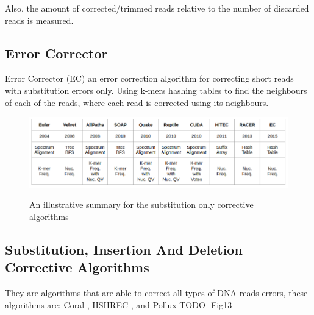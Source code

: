 \documentclass{llncs}
\begin{document}
Also, the amount of corrected/trimmed reads relative to the number of discarded reads is measured. 
\subsection{Error Corrector}
Error Corrector (EC) \cite{EC} an error correction algorithm for correcting short reads with substitution errors only. Using k-mers hashing tables to find the neighbours of each of the reads, where each read is corrected using its neighbours.

\begin{figure}
	\centering
	\includegraphics[width=.951\linewidth]{./figs/RW-1}
	\label{fig:fig12}
	\caption[caption]{An illustrative summary for the substitution only corrective algorithms}
\end{figure}


\subsection{Substitution, Insertion And Deletion Corrective Algorithms}
They are algorithms that are able to correct all types of DNA reads errors, these algorithms are: Coral \cite{Coral}, HSHREC \cite{HShrec}, and Pollux \cite{Pollux} TODO- Fig13
\end{document}
